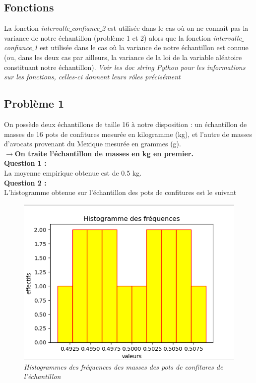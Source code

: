 \documentclass{article}      %
\begin{document}
\subsection{Fonctions}

La fonction \textit{intervalle$\_$confiance$\_$2} est utilisée dans le cas où on ne connaît pas la variance de notre échantillon (problème 1 et 2) alors que la fonction \textit{intervalle$\_$confiance$\_$1} est utilisée dans le cas où la variance de notre échantillon est connue (ou, dans les deux cas par ailleurs, la variance de la loi de la variable aléatoire constituant notre échantillon).
\textit{Voir les doc string Python pour les informations sur les fonctions, celles-ci donnent leurs rôles précisément}

\subsection{Problème 1}
On possède deux échantillons de taille 16 à notre disposition : un échantillon de masses de 16 pots de confitures mesurée en kilogramme (kg), et l'autre de masses d'avocats provenant du Mexique mesurée en grammes (g).\\

\textbf{$\rightarrow$On traite l'échantillon de masses en kg en premier.}\\

\textbf{Question 1 :} \\ La moyenne empirique obtenue est de 0.5 kg.\\
\textbf{Question 2 :} \\ L'histogramme obtenue sur l'échantillon des pots de confitures est le suivant\\

\begin{figure}[H]
    \centering
     \scalebox{.75}
     {
     	\includegraphics[scale=1]{img/histogr_frequ_masses_pots.png} 
     }
     \\
     \textit{Histogrammes des fréquences des masses des pots de confitures de l'échantillon}
\end{figure}
\end{document}
